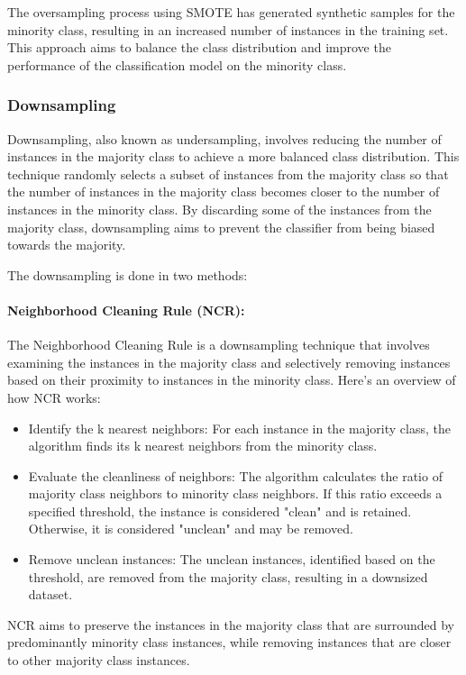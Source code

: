 \documentclass{article}
\begin{document}
The oversampling process using SMOTE has generated synthetic samples for the minority class, resulting in an increased number of instances in the training set. This approach aims to balance the class distribution and improve the performance of the classification model on the minority class.

\subsubsection{Downsampling} 
Downsampling, also known as undersampling, involves reducing the number of instances in the majority class to achieve a more balanced class distribution. This technique randomly selects a subset of instances from the majority class so that the number of instances in the majority class becomes closer to the number of instances in the minority class. By discarding some of the instances from the majority class, downsampling aims to prevent the classifier from being biased towards the majority.

The downsampling is done in two methods:

\paragraph{Neighborhood Cleaning Rule (NCR):}
     The Neighborhood Cleaning Rule is a downsampling technique that involves examining the instances in the majority class and selectively removing instances based on their proximity to instances in the minority class. Here's an overview of how NCR works:
       \begin{itemize}
            \item Identify the k nearest neighbors: For each instance in the majority class, the algorithm finds its k nearest neighbors from the minority class.
            \item Evaluate the cleanliness of neighbors: The algorithm calculates the ratio of majority class neighbors to minority class neighbors. If this ratio exceeds a specified threshold, the instance is considered "clean" and is retained. Otherwise, it is considered "unclean" and may be removed.
            \item Remove unclean instances: The unclean instances, identified based on the threshold, are removed from the majority class, resulting in a downsized dataset.
        \end{itemize}
NCR aims to preserve the instances in the majority class that are surrounded by predominantly minority class instances, while removing instances that are closer to other majority class instances.
\end{document}
